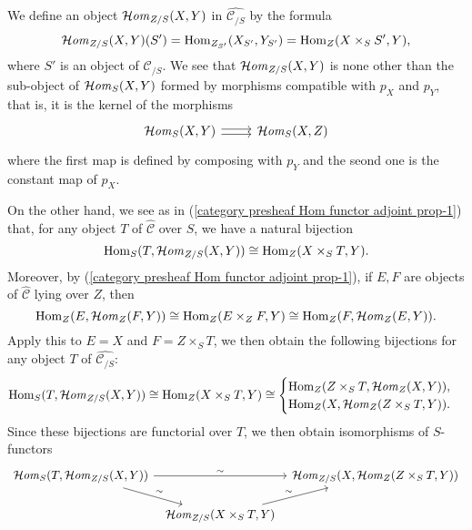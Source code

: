 \begin{definition}
We define an object $\operatorname{\mathcal{H}\hspace*{-0.4pt}\textit{om}\hspace{0.5pt}}_{Z/S}(X,Y)$ in $\widehat{\mathcal{C}_{/S}}$ by the formula
\[\operatorname{\mathcal{H}\hspace*{-0.4pt}\textit{om}\hspace{0.5pt}}_{Z/S}(X,Y)(S')=\mathrm{Hom}_{Z_{S'}}(X_{S'},Y_{S'})=\mathrm{Hom}_Z(X\times_SS',Y),\]
where $S'$ is an object of $\mathcal{C}_{/S}$. We see that $\operatorname{\mathcal{H}\hspace*{-0.4pt}\textit{om}\hspace{0.5pt}}_{Z/S}(X,Y)$ is none other than the sub-object of $\operatorname{\mathcal{H}\hspace*{-0.4pt}\textit{om}\hspace{0.5pt}}_S(X,Y)$ formed by morphisms compatible with $p_X$ and $p_Y$, that is, it is the kernel of the morphisms
\[\begin{tikzcd}
\sHom_S(X,Y)\ar[r,shift left=2pt]\ar[r,shift right=2pt]&\sHom_S(X,Z)
\end{tikzcd}\]
where the first map is defined by composing with $p_Y$ and the seond one is the constant map of $p_X$.
\end{definition}

On the other hand, we see as in (\ref{category presheaf Hom functor adjoint prop-1}) that, for any object $T$ of $\widehat{\mathcal{C}}$ over $S$, we have a natural bijection
\[\mathrm{Hom}_S(T,\operatorname{\mathcal{H}\hspace*{-0.4pt}\textit{om}\hspace{0.5pt}}_{Z/S}(X,Y))\cong \mathrm{Hom}_Z(X\times_ST,Y).\]
Moreover, by (\ref{category presheaf Hom functor adjoint prop-1}), if $E,F$ are objects of $\widehat{\mathcal{C}}$ lying over $Z$, then
\[\mathrm{Hom}_Z(E,\operatorname{\mathcal{H}\hspace*{-0.4pt}\textit{om}\hspace{0.5pt}}_Z(F,Y))\cong\mathrm{Hom}_Z(E\times_ZF,Y)\cong\mathrm{Hom}_Z(F,\operatorname{\mathcal{H}\hspace*{-0.4pt}\textit{om}\hspace{0.5pt}}_Z(E,Y)).\]
Apply this to $E=X$ and $F=Z\times_ST$, we then obtain the following bijections for any object $T$ of $\widehat{\mathcal{C}_{/S}}$:
\begin{equation}\label{category of presheaf functor Hom_Z/S(X,Y) isomorphism-1}
\mathrm{Hom}_S(T,\operatorname{\mathcal{H}\hspace*{-0.4pt}\textit{om}\hspace{0.5pt}}_{Z/S}(X,Y))\cong\mathrm{Hom}_Z(X\times_ST,Y)\cong\begin{cases}
\mathrm{Hom}_Z(Z\times_ST,\operatorname{\mathcal{H}\hspace*{-0.4pt}\textit{om}\hspace{0.5pt}}_Z(X,Y)),\\
\mathrm{Hom}_Z(X,\operatorname{\mathcal{H}\hspace*{-0.4pt}\textit{om}\hspace{0.5pt}}_Z(Z\times_ST,Y)).
\end{cases}
\end{equation}
Since these bijections are functorial over $T$, we then obtain isomorphisms of $S$-functors
\begin{equation}\label{category of presheaf functor Hom_Z/S(X,Y) isomorphism-2}
\begin{tikzcd}[row sep=5mm, column sep=2mm]
\sHom_S(T,\sHom_{Z/S}(X,Y))\ar[rd,"\sim"]\ar[rr,"\sim"]&&\sHom_{Z/S}(X,\sHom_Z(Z\times_ST,Y))\\
&\sHom_{Z/S}(X\times_ST,Y)\ar[ru,"\sim"]&
\end{tikzcd}
\end{equation}

